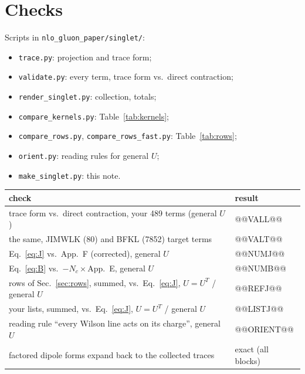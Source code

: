 \documentclass[10pt]{article}
\numberwithin{equation}{section}
\begin{document}
\section{Checks}\label{app:checks}
Scripts in \texttt{nlo\_gluon\_paper/singlet/}:
\begin{itemize}
\item \texttt{trace.py}: projection and trace form;
\item \texttt{validate.py}: every term, trace form vs.\ direct contraction;
\item \texttt{render\_singlet.py}: collection, totals;
\item \texttt{compare\_kernels.py}: Table~\ref{tab:kernels};
\item \texttt{compare\_rows.py}, \texttt{compare\_rows\_fast.py}: Table~\ref{tab:rows};
\item \texttt{orient.py}: reading rules for general $U$;
\item \texttt{make\_singlet.py}: this note.
\end{itemize}
\begin{table}[H]\centering\small
\begin{tabular}{@{}p{}p{}@{}}\toprule
check & result\\\midrule
trace form vs.\ direct contraction, your 489 terms (general $U$) & @@VALL@@\\
the same, JIMWLK (80) and BFKL (7852) target terms & @@VALT@@\\
Eq.~\eqref{eq:J} vs.\ App.~F (corrected), general $U$ & @@NUMJ@@\\
Eq.~\eqref{eq:B} vs.\ $-N_c\times$App.~E, general $U$ & @@NUMB@@\\
rows of Sec.~\ref{sec:rows}, summed, vs.\ Eq.~\eqref{eq:J}, $U=U^T$ / general $U$ & @@REFJ@@\\
your lists, summed, vs.\ Eq.~\eqref{eq:J}, $U=U^T$ / general $U$ & @@LISTJ@@\\
reading rule ``every Wilson line acts on its charge'', general $U$ & @@ORIENT@@\\
factored dipole forms expand back to the collected traces & exact (all blocks)\\\bottomrule
\end{tabular}
\end{table}
\end{document}
